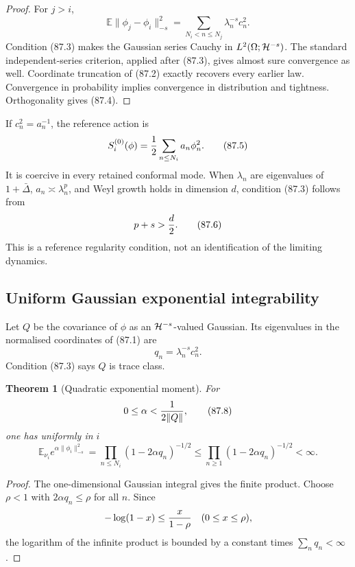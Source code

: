 \documentclass[11pt]{article}
\newtheorem{theorem}{Theorem}[section]
\begin{document}
\begin{proof}
For \(j>i\),
\[
 \mathbb E\|\phi_j-\phi_i\|_{-s}^2
 =\sum_{N_i<n\le N_j}\lambda_n^{-s}c_n^2.
\]
Condition (87.3) makes the Gaussian series Cauchy in
\(L^2(\Omega;{\cal H}^{-s})\).  The standard independent-series
criterion, applied after (87.3), gives almost sure convergence as
well.  Coordinate truncation of (87.2) exactly recovers every earlier
law.  Convergence in probability implies convergence in distribution
and tightness.  Orthogonality gives (87.4).
\end{proof}

If \(c_n^2=a_n^{-1}\), the reference action is
\[
                         S_i^{(0)}(\phi)
                         ={1\over2}\sum_{n\le N_i}a_n\phi_n^2.
                                                                    \tag{87.5}
\]
It is coercive in every retained conformal mode.  When
\(\lambda_n\) are eigenvalues of \(1+\bar\Delta\),
\(a_n\asymp\lambda_n^p\), and Weyl growth holds in dimension \(d\),
condition (87.3) follows from
\[
                                      p+s>{d\over2}.          \tag{87.6}
\]
This is a reference regularity condition, not an identification of
the limiting dynamics.

\subsection{Uniform Gaussian exponential integrability}

Let \(Q\) be the covariance of \(\phi\) as an
\({\cal H}^{-s}\)-valued Gaussian.  Its eigenvalues in the normalised
coordinates of (87.1) are
\[
                              q_n=\lambda_n^{-s}c_n^2.        \tag{87.7}
\]
Condition (87.3) says \(Q\) is trace class.

\begin{theorem}[Quadratic exponential moment]
\label{thm:v11v87-exponential}
For
\[
                              0\le\alpha<{1\over2\|Q\|},     \tag{87.8}
\]
one has uniformly in \(i\)
\[
 \mathbb E_{\nu_i}e^{\alpha\|\phi_i\|_{-s}^2}
 =\prod_{n\le N_i}(1-2\alpha q_n)^{-1/2}
 \le\prod_{n\ge1}(1-2\alpha q_n)^{-1/2}<\infty.              \tag{87.9}
\]
\end{theorem}

\begin{proof}
The one-dimensional Gaussian integral gives the finite product.
Choose \(\rho<1\) with \(2\alpha q_n\le\rho\) for all \(n\).
Since
\[
                         -\log(1-x)\le{x\over1-\rho}
                         \quad(0\le x\le\rho),
\]
the logarithm of the infinite product is bounded by a constant times
\(\sum_nq_n<\infty\).
\end{proof}
\end{document}
